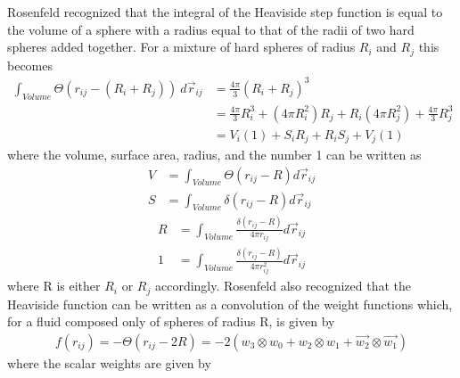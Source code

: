 \documentclass[double,12pt]{beavtex}
\begin{document}
%
Rosenfeld recognized that the integral of the Heaviside step function
is equal to the volume of a sphere with a radius equal to that of the radii 
of two hard spheres added together. For a mixture of hard spheres of radius $R_i$ and $R_j$
this becomes
\begin{align}
       \int_{Volume} \Theta(r_{ij}-(R_i+R_j))~d\vec r_{ij} &=\frac{4\pi}{3}(R_i+R_j)^3  \label{exclusion-volume}\\
       &= \frac{4\pi}{3}R_i^3 + (4\pi R_i^2)R_j + R_i(4\pi R_j^2) + \frac{4\pi}{3}R_j^3  \nonumber \\
       &= V_i(1) + S_iR_j + R_iS_j+ V_j(1)  \label{VSR1sum}
\end{align}  
where the volume, surface area, radius, and the number 1 can be written as
\begin{align}
        V &= \int_{Volume} \Theta(r_{ij}-R)d\vec r_{ij} \\
        S &= \int_{Volume} \delta(r_{ij} -R) d\vec r_{ij}  
\end{align}
\begin{align}
        R &= \int_{Volume} \frac{\delta(r_{ij} -R)}{4\pi r_{ij}} d\vec r_{ij} \\
        1 &= \int_{Volume} \frac{\delta(r_{ij} -R)}{4\pi r_{ij}^2} d\vec r_{ij}    
\end{align}
where R is either $R_i$ or $R_j$ accordingly. Rosenfeld also recognized that the 
Heaviside function can be written as a convolution of the weight functions 
which, for a fluid composed only of spheres of radius R, is given by
\begin{align} \label{mayerconvolution}
    f(r_{ij})=-\Theta(r_{ij}-2R)= -2(w_3 \otimes w_0 + w_2 \otimes w_1 + \vec{w_2} \otimes \vec{w_1})
\end{align} 
where the scalar weights are given by
\end{document}
